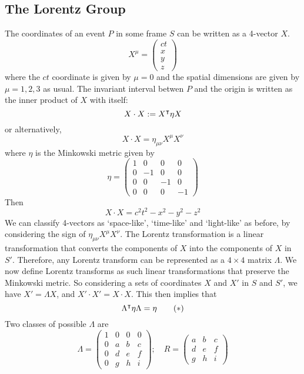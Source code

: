 \subsection{The Lorentz Group}
The coordinates of an event \(P\) in some frame \(S\) can be written as a 4-vector \(X\).
\[
	X^\mu = \begin{pmatrix}
		ct \\ x \\ y \\ z
	\end{pmatrix}
\]
where the \(ct\) coordinate is given by \(\mu = 0\) and the spatial dimensions are given by \(\mu = 1, 2, 3\) as usual.
The invariant interval betwen \(P\) and the origin is written as the inner product of \(X\) with itself:
\[
	X \cdot X := X^\intercal \eta X
\]
or alternatively,
\[
	X \cdot X = \eta_{\mu\nu} X^\mu X^\nu
\]
where \(\eta\) is the Minkowski metric given by
\[
	\eta = \begin{pmatrix}
		1 & 0  & 0  & 0  \\
		0 & -1 & 0  & 0  \\
		0 & 0  & -1 & 0  \\
		0 & 0  & 0  & -1
	\end{pmatrix}
\]
Then
\[
	X \cdot X = c^2t^2 - x^2 - y^2 - z^2
\]
We can classify 4-vectors as `space-like', `time-like' and `light-like' as before, by considering the sign of \(\eta_{\mu\nu}X^\mu X^\nu\).
The Lorentz transformation is a linear transformation that converts the components of \(X\) into the components of \(X\) in \(S'\).
Therefore, any Lorentz transform can be represented as a \(4\times 4\) matrix \(\Lambda\).
We now define Lorentz transforms as such linear transformations that preserve the Minkowski metric.
So considering a sets of coordinates \(X\) and \(X'\) in \(S\) and \(S'\), we have \(X' = \Lambda X\), and \(X' \cdot X' = X \cdot X\).
This then implies that
\begin{equation}
	\Lambda^\intercal \eta \Lambda = \eta \tag{\(\ast\)}
\end{equation}
Two classes of possible \(\Lambda\) are
\[
	\Lambda = \begin{pmatrix}
		1 & 0 & 0 & 0 \\
		0 & a & b & c \\
		0 & d & e & f \\
		0 & g & h & i
	\end{pmatrix};\quad R = \begin{pmatrix}
		a & b & c \\
		d & e & f \\
		g & h & i
	\end{pmatrix}
\]
